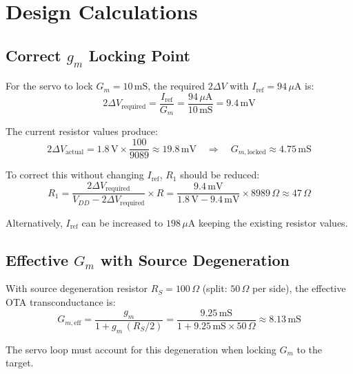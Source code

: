 \documentclass[12pt,a4paper]{article}
\begin{document}
\section{Design Calculations}

\subsection{Correct $g_m$ Locking Point}

For the servo to lock $G_m = 10\,\text{mS}$, the required $2\Delta V$ with
$I_{\text{ref}} = 94\,\mu\text{A}$ is:
\begin{equation}
  2\Delta V_{\text{required}} = \frac{I_{\text{ref}}}{G_m}
  = \frac{94\,\mu\text{A}}{10\,\text{mS}} = 9.4\,\text{mV}
\end{equation}

The current resistor values produce:
\begin{equation}
  2\Delta V_{\text{actual}} = 1.8\,\text{V} \times \frac{100}{9089} \approx 19.8\,\text{mV}
  \quad\Rightarrow\quad G_{m,\text{locked}} \approx 4.75\,\text{mS}
\end{equation}

To correct this without changing $I_{\text{ref}}$, $R_1$ should be reduced:
\begin{equation}
  R_1 = \frac{2\Delta V_{\text{required}}}{V_{DD} - 2\Delta V_{\text{required}}}
        \times R
  = \frac{9.4\,\text{mV}}{1.8\,\text{V} - 9.4\,\text{mV}} \times 8989\,\Omega
  \approx 47\,\Omega
\end{equation}

Alternatively, $I_{\text{ref}}$ can be increased to $198\,\mu\text{A}$ keeping the
existing resistor values.

\subsection{Effective $G_m$ with Source Degeneration}

With source degeneration resistor $R_S = 100\,\Omega$ (split: $50\,\Omega$ per side),
the effective OTA transconductance is:
\begin{equation}
  G_{m,\text{eff}} = \frac{g_m}{1 + g_m\,(R_S/2)}
  = \frac{9.25\,\text{mS}}{1 + 9.25\,\text{mS} \times 50\,\Omega}
  \approx 8.13\,\text{mS}
\end{equation}

The servo loop must account for this degeneration when locking $G_m$ to the target.
\end{document}
